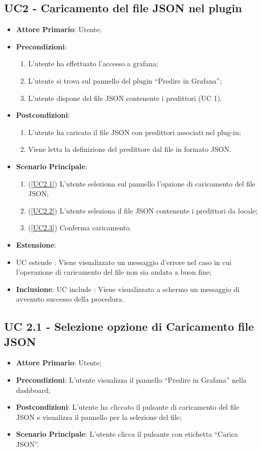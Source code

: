 	\subsection{UC2 - Caricamento del file JSON nel plugin}
		\begin{itemize}
			\item\textbf{Attore Primario}: Utente;
			\item\textbf{Precondizioni}: 
				\begin{enumerate}
					\item L’utente ha effettuato l’accesso a grafana;
					\item L’utente si trova sul pannello del plugin “Predire in Grafana”;
					\item L’utente dispone del file JSON contenente i predittori (UC 1). 
				\end{enumerate}
			\item\textbf{Postcondizioni}:
				\begin{enumerate}
					\item L’utente ha caricato il file JSON con predittori associati nel plug-in;
					\item Viene letta la definizione del predittore dal file in formato JSON. 
				\end{enumerate}
			\item\textbf{Scenario Principale}:
				\begin{enumerate}
					\item (\ref{UC2.1}) L’utente seleziona sul pannello l’opzione di caricamento del file JSON; 
					\item (\ref{UC2.2}) L’utente seleziona il file JSON contenente i predittori da locale;
					\item (\ref{UC2.3}) Conferma caricamento.
				\end{enumerate}
			\item\textbf{Estensione}:
					\item UC estende \label{UC2.3}: Viene visualizzato un messaggio d’errore nel caso in cui l’operazione di caricamento del file non sia andata a buon fine;
			\item\textbf{Inclusione}: UC include \label{UC2.3}:  Viene visualizzato a schermo un messaggio di avvenuto successo della procedura.
		\end{itemize}
		
		\subsection{UC 2.1 -  Selezione opzione di Caricamento file JSON}
		\begin{itemize}
			\item\textbf{Attore Primario}: Utente;
			\item\textbf{Precondizioni}: L’utente visualizza il pannello “Predire in Grafana” nella dashboard;
			\item\textbf{Postcondizioni}: L’utente ha cliccato il pulsante di caricamento del file JSON e visualizza il pannello per la selezione del file;
			\item\textbf{Scenario Principale}: L’utente clicca il pulsante con etichetta  “Carica JSON”.
		\end{itemize}		

